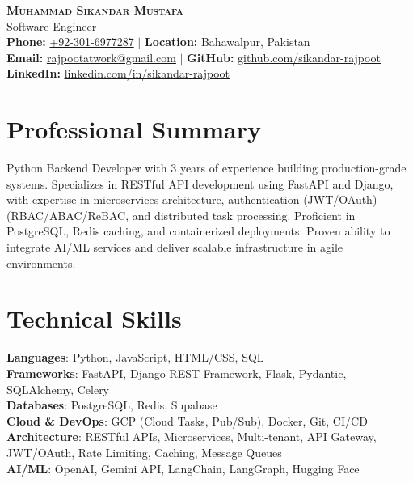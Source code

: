 \documentclass[letterpaper,11pt]{article}
\begin{document}
\begin{center}
    \textbf{\Huge \scshape Muhammad Sikandar Mustafa} \\ \vspace{8pt}
    \large Software Engineer \\ \vspace{5pt}
    \small
    \textbf{Phone:} \href{tel:+923016977287}{+92-301-6977287} $|$
    \textbf{Location:} Bahawalpur, Pakistan \\
    \textbf{Email:} \href{mailto:rajpootatwork@gmail.com}{\underline{rajpootatwork@gmail.com}} $|$
    \textbf{GitHub:} \href{https://github.com/sikandar-rajpoot}{\underline{github.com/sikandar-rajpoot}} $|$
    \textbf{LinkedIn:} \href{https://www.linkedin.com/in/sikandar-rajpoot/}{\underline{linkedin.com/in/sikandar-rajpoot}}
\end{center}

\section{Professional Summary}
\small{Python Backend Developer with 3 years of experience building production-grade systems. Specializes in RESTful API development using FastAPI and Django, with expertise in microservices architecture, authentication (JWT/OAuth)(RBAC/ABAC/ReBAC, and distributed task processing. Proficient in PostgreSQL, Redis caching, and containerized deployments. Proven ability to integrate AI/ML services and deliver scalable infrastructure in agile environments.}

\section{Technical Skills}
 \begin{itemize}[leftmargin=0.15in, label={}]
    \small{\item{
     \textbf{Languages}{: Python, JavaScript, HTML/CSS, SQL} \\
     \textbf{Frameworks}{: FastAPI, Django REST Framework, Flask, Pydantic, SQLAlchemy, Celery} \\
     \textbf{Databases}{: PostgreSQL, Redis, Supabase} \\
     \textbf{Cloud \& DevOps}{: GCP (Cloud Tasks, Pub/Sub), Docker, Git, CI/CD} \\
     \textbf{Architecture}{: RESTful APIs, Microservices, Multi-tenant, API Gateway, JWT/OAuth, Rate Limiting, Caching, Message Queues} \\
     \textbf{AI/ML}{: OpenAI, Gemini API, LangChain, LangGraph, Hugging Face}
    }}
 \end{itemize}
\end{document}
